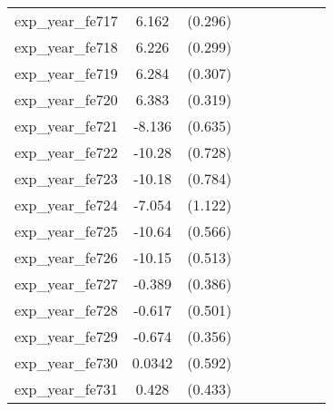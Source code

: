 {\begin{tabular}{l*{4}{cc}}
exp\_year\_fe717&    6.162\sym{***}&  (0.296)&                  &         &                  &         &                  &         \\
exp\_year\_fe718&    6.226\sym{***}&  (0.299)&                  &         &                  &         &                  &         \\
exp\_year\_fe719&    6.284\sym{***}&  (0.307)&                  &         &                  &         &                  &         \\
exp\_year\_fe720&    6.383\sym{***}&  (0.319)&                  &         &                  &         &                  &         \\
exp\_year\_fe721&   -8.136\sym{***}&  (0.635)&                  &         &                  &         &                  &         \\
exp\_year\_fe722&   -10.28\sym{***}&  (0.728)&                  &         &                  &         &                  &         \\
exp\_year\_fe723&   -10.18\sym{***}&  (0.784)&                  &         &                  &         &                  &         \\
exp\_year\_fe724&   -7.054\sym{***}&  (1.122)&                  &         &                  &         &                  &         \\
exp\_year\_fe725&   -10.64\sym{***}&  (0.566)&                  &         &                  &         &                  &         \\
exp\_year\_fe726&   -10.15\sym{***}&  (0.513)&                  &         &                  &         &                  &         \\
exp\_year\_fe727&   -0.389         &  (0.386)&                  &         &                  &         &                  &         \\
exp\_year\_fe728&   -0.617         &  (0.501)&                  &         &                  &         &                  &         \\
exp\_year\_fe729&   -0.674         &  (0.356)&                  &         &                  &         &                  &         \\
exp\_year\_fe730&   0.0342         &  (0.592)&                  &         &                  &         &                  &         \\
exp\_year\_fe731&    0.428         &  (0.433)&                  &         &                  &         &                  &         \\

\end{tabular}}
